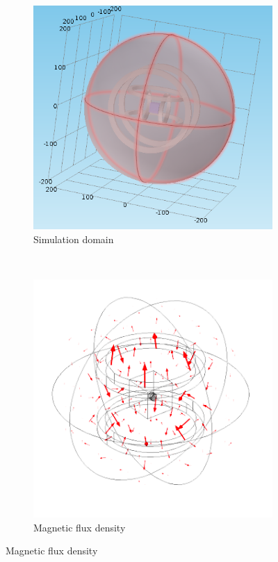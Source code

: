 \documentclass[12pt,a4paper,titlepage]{report}
\begin{document}
\begin{figure}
        \centering
        \begin{subfigure}[b]{0.48\textwidth}
                \includegraphics[width=\textwidth]{simulationDomain}
                \caption{Simulation domain}
                \label{simulation}
        \end{subfigure}~~ 
\begin{subfigure}[b]{0.48\textwidth}
                \includegraphics[width=\textwidth]{arrow_magnetic}
                \caption{Magnetic flux density}
                \label{helix-in-box}
        \end{subfigure}
      

\end{figure}
\end{document}
